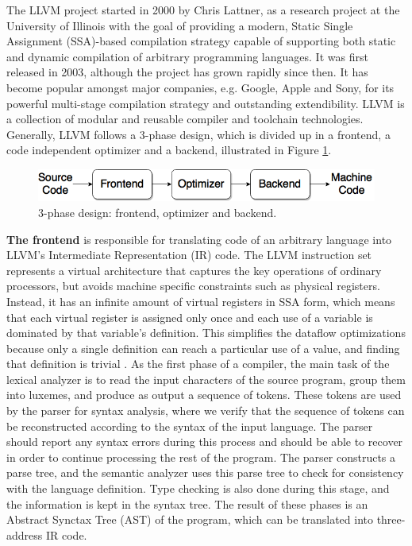 The LLVM project started in 2000 by Chris Lattner, as a research project at the University of Illinois with the goal of providing a modern, Static Single Assignment (SSA)-based compilation strategy capable of supporting both static and dynamic compilation of arbitrary programming languages. It was first released in 2003, although the project has grown rapidly since then. It has become popular amongst major companies, e.g. Google, Apple and Sony, for its powerful multi-stage compilation strategy and outstanding extendibility. LLVM is a collection of modular and reusable compiler and toolchain technologies. Generally, LLVM follows a 3-phase design, which is divided up in a frontend, a code independent optimizer and a backend, illustrated in Figure \ref{fig:3phase_design}.

\begin{figure}[H]
\centering
\includegraphics[width=.7\textwidth]{figures/3phase_design}
\caption{3-phase design: frontend, optimizer and backend.}
\label{fig:3phase_design}
\end{figure}

\textbf{The frontend} is responsible for translating code of an arbitrary language into LLVM's Intermediate Representation (IR) code. The LLVM instruction set represents a virtual architecture that captures the key operations of ordinary processors, but avoids machine specific constraints such as physical registers. Instead, it has an infinite amount of virtual registers in SSA form, which means that each virtual register is assigned only once and each use of a variable is dominated by that variable's definition. This simplifies the dataflow optimizations because only a single definition can reach a particular use of a value, and finding that definition is trivial \cite{llvm_strategy}.
As the first phase of a compiler, the main task of the lexical analyzer is to read the input characters of the source program, group them into luxemes, and produce as output a sequence of tokens. These tokens are used by the parser for syntax analysis, where we verify that the sequence of tokens can be reconstructed according to the syntax of the input language. The parser should report any syntax errors during this process and should be able to recover in order to continue processing the rest of the program. The parser constructs a parse tree, and the semantic analyzer uses this parse tree to check for consistency with the language definition. Type checking is also done during this stage, and the information is kept in the syntax tree. The result of these phases is an Abstract Synctax Tree (AST) of the program, which can be translated into three-address IR code. %

